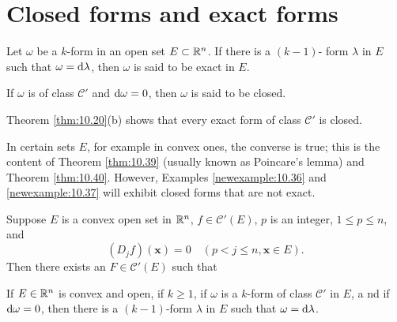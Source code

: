 
\section{Closed forms and exact forms}

\begin{mydef}
    Let $\omega$ be a $k$-form in an open set $E \subset {\protect\mathbb R}^n$. 
    If there is a $(k - 1)$- form $\lambda$ in $E$ such that $\omega = \d \lambda$, then $\omega$ is said to be exact in $E$.
    
    If $\omega$ is of class $\mathscr{C}'$ and $\d \omega = 0$, 
    then $\omega$ is said to be closed.
    
    Theorem \ref{thm:10.20}(b) shows that every exact form of class $\mathscr{C}'$ is closed.

    In certain sets $E$, for example in convex ones, the converse is true; 
    this is the content of Theorem \ref{thm:10.39} 
    (usually known as Poincare's lemma) and Theorem \ref{thm:10.40}. 
    However, Examples \ref{newexample:10.36} and \ref{newexample:10.37} will exhibit closed forms that are not exact.
\end{mydef}

\begin{myRemark}
    
\end{myRemark}

\begin{newexample}
    \label{newexample:10.36}
\end{newexample}

\begin{newexample}
    \label{newexample:10.37}
\end{newexample}

\begin{thm}
    \label{thm:10.38}
    Suppose $E$ is a convex open set in ${\protect\mathbb R}^n$,
    $f \in \mathscr{C}'(E)$, $p$ is an integer, 
    $1 \leq p \leq n$, and
    \begin{equation}
        \label{eq:10.116}
        (D_j f)(\mathbf{x}) = 0
        \quad 
        (p < j \leq n, \mathbf{x} \in E).
    \end{equation}
    Then there exists an $F \in \mathscr{C}'(E)$ such that
\end{thm}

\begin{thm}
    \label{thm:10.39}
    If $E \in {\protect\mathbb R}^n$ is convex and open, 
    if $k \geq 1$, 
    if $\omega$ is a $k$-form of class $\mathscr{C}'$ in $E$, a
    nd if $\d \omega = 0$, 
    then there is a $(k - 1)$-form $\lambda$ in $E$ 
    such that $\omega = \d \lambda$.
\end{thm}

